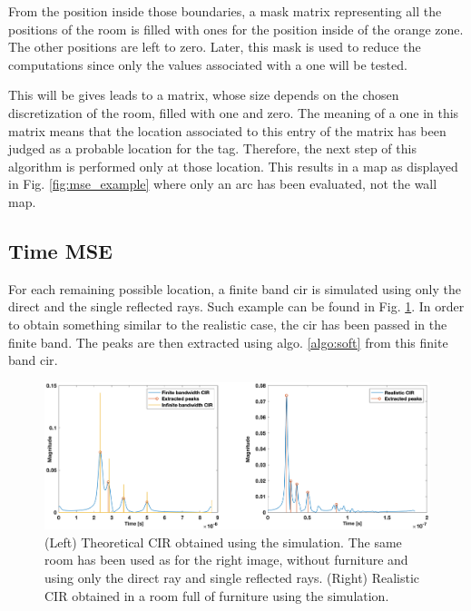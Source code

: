 From the position inside those boundaries, a mask matrix representing all the positions of the room is filled with ones for the position inside of the orange zone. The other positions are left to zero. Later, this mask is used to reduce the computations since only the values associated with a one will be tested.
\vspace{2mm}

This will be gives leads to a matrix, whose size depends on the chosen discretization of the room, filled with one and zero. The meaning of a one in this matrix means that the location associated to this entry of the matrix has been judged as a probable location for the tag. Therefore, the next step of this algorithm is performed only at those location. This results in a map as displayed in Fig. \ref{fig:mse_example} where only an arc has been evaluated, not the wall map.

\subsection{Time MSE}

For each remaining possible location, a finite band \gls{cir} is simulated using only the direct and the single reflected rays. Such example can be found in Fig. \ref{fig:soft_simu}. In order to obtain something similar to the realistic case, the \gls{cir} has been passed in the finite band. The peaks are then extracted using algo. \ref{algo:soft} from this finite band \gls{cir}.

\begin{figure}[H]
\centering
\includegraphics[width=\linewidth]{Images/inf_vs_fin.png}
\caption{(Left) Theoretical CIR obtained using the simulation. The same room has been used as for the right image, without furniture and using only the direct ray and single reflected rays.  (Right) Realistic CIR obtained in a room full of furniture using the simulation.\label{fig:soft_simu}}
\end{figure}

